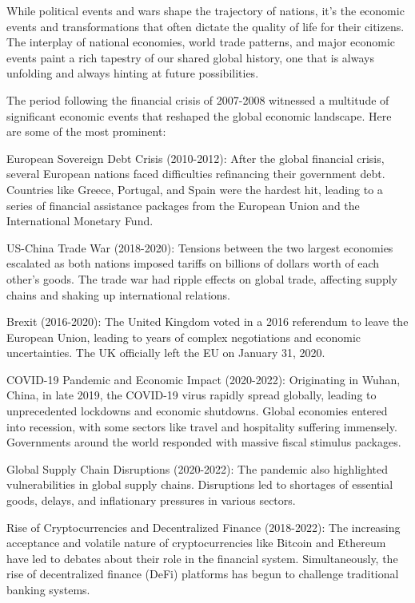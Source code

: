 While political events and wars shape the trajectory of nations, it's the economic events and transformations that often dictate the quality of life for their citizens. The interplay of national economies, world trade patterns, and major economic events paint a rich tapestry of our shared global history, one that is always unfolding and always hinting at future possibilities.

The period following the financial crisis of 2007-2008 witnessed a multitude of significant economic events that reshaped the global economic landscape. Here are some of the most prominent:

European Sovereign Debt Crisis (2010-2012): After the global financial crisis, several European nations faced difficulties refinancing their government debt. Countries like Greece, Portugal, and Spain were the hardest hit, leading to a series of financial assistance packages from the European Union and the International Monetary Fund.

US-China Trade War (2018-2020): Tensions between the two largest economies escalated as both nations imposed tariffs on billions of dollars worth of each other's goods. The trade war had ripple effects on global trade, affecting supply chains and shaking up international relations.

Brexit (2016-2020): The United Kingdom voted in a 2016 referendum to leave the European Union, leading to years of complex negotiations and economic uncertainties. The UK officially left the EU on January 31, 2020.

COVID-19 Pandemic and Economic Impact (2020-2022): Originating in Wuhan, China, in late 2019, the COVID-19 virus rapidly spread globally, leading to unprecedented lockdowns and economic shutdowns. Global economies entered into recession, with some sectors like travel and hospitality suffering immensely. Governments around the world responded with massive fiscal stimulus packages.

Global Supply Chain Disruptions (2020-2022): The pandemic also highlighted vulnerabilities in global supply chains. Disruptions led to shortages of essential goods, delays, and inflationary pressures in various sectors.

Rise of Cryptocurrencies and Decentralized Finance (2018-2022): The increasing acceptance and volatile nature of cryptocurrencies like Bitcoin and Ethereum have led to debates about their role in the financial system. Simultaneously, the rise of decentralized finance (DeFi) platforms has begun to challenge traditional banking systems.


